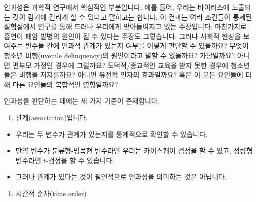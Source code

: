 \documentclass[]{book}
\providecommand{\tightlist}{%
  \setlength{\itemsep}{0pt}\setlength{\parskip}{0pt}}
\begin{document}
인과성은 과학적 연구에서 핵심적인 부분입니다. 예를 들어, 우리는 바이러스에 노출되는 것이 감기에 걸리게 할 수 있다고 말하고는 합니다. 이 결과는 여러 조건들이 통제된 실험실에서 연구를 통해 드러나 우리에게 받아들여지고 있는 주장입니다. 마찬가지로 흡연이 폐암 발병의 원인이 될 수 있다는 주장도 그렇습니다. 그러나 사회적 현상을 보여주는 변수들 간에 인과적 관계가 있는지 여부를 어떻게 판단할 수 있을까요? 무엇이 청소년 비행(uvenile delinquency)의 원인이라고 말할 수 있을까요? 가난일까요? 아니면 편부모 가정인 경우에 그럴까요? 도덕적/종교적인 교육을 받지 못한 경우에 청소년들은 비행을 저지를까요? 아니면 유전적 인자의 효과일까요? 혹은 이 모든 요인들에 더해 다른 요인들의 복합적인 영향일까요?

인과성을 판단하는 데에는 세 가지 기준이 존재합니다.

\begin{enumerate}
\def\labelenumi{\arabic{enumi}.}
\tightlist
\item
  관계(association)입니다.
\end{enumerate}

\begin{itemize}
\tightlist
\item
  우리는 두 변수가 관계가 있는지를 통계적으로 확인할 수 있습니다.
\item
  만약 변수가 분류형-명목현 변수라면 우리는 카이스퀘어 검정을 할 수 있고, 정량형 변수라면 \(t\)-검정을 할 수 있습니다.
\item
  그러나 관계가 있다는 것이 필연적으로 인과성을 의미하는 것은 아닙니다.
\end{itemize}

\begin{enumerate}
\def\labelenumi{\arabic{enumi}.}
\setcounter{enumi}{1}
\tightlist
\item
  시간적 순차(time order)
\end{enumerate}
\end{document}
